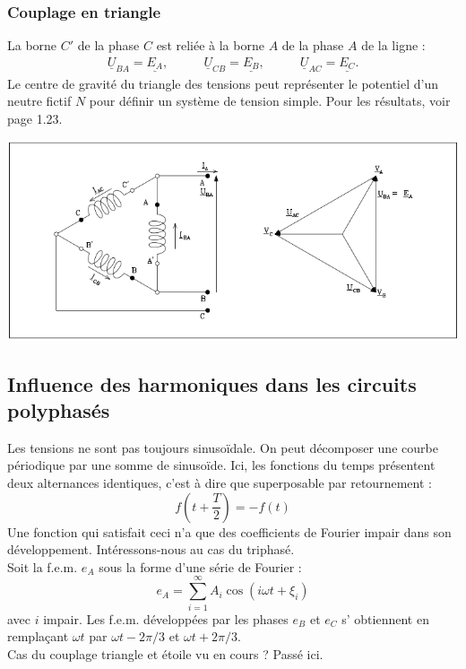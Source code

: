 \subsubsection{Couplage en triangle}
La borne $C'$ de la phase $C$ est reliée à la borne $A$ de la phase 
$A$ de la ligne :
\begin{equation}
	\begin{array}{ccc}
		\underline{U}_{BA} = \underline{E_A},\quad & \quad \underline{U}_{CB} =                  
		\underline{E_B}, \quad                     & \quad \underline{U}_{AC} = \underline{E_C}. 
	\end{array}		
\end{equation}
Le centre de gravité du triangle des tensions peut représenter le 
potentiel d'un neutre fictif $N$ pour définir un système de tension 
simple. Pour les résultats, voir page 1.23.
\begin{center}
	\includegraphics[scale=0.4]{ch1/image10.png}
\end{center}		
		
		
\subsection{Influence des harmoniques dans les circuits polyphasés}
Les tensions ne sont pas toujours sinusoïdale. On peut décomposer une courbe 
périodique par une somme de sinusoïde. Ici, les fonctions du temps 
présentent deux alternances identiques, c'est à dire que superposable par 
retournement :
\begin{equation}
	f(t+\frac{T}{2}) = -f(t)
\end{equation}
Une fonction qui satisfait ceci n'a que des coefficients de Fourier impair 
dans son développement. Intéressons-nous au cas du triphasé. \\
Soit la f.e.m. $e_A$ sous la forme d'une série de Fourier :
\begin{equation}
	e_A = \sum_{i=1}^\infty A_i\cos(i\omega t + \xi_i)
\end{equation}
avec $i$ impair. Les f.e.m. développées par les phases $e_B$ et $e_C$ s'
obtiennent en remplaçant $\omega t$ par $\omega t - 2\pi/3$ et $\omega t 
+2\pi/3$.\\
Cas du couplage triangle et étoile vu en cours ? Passé ici.
	

